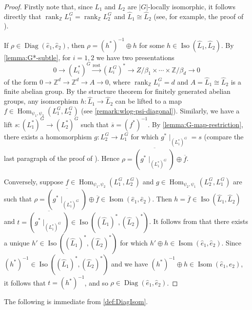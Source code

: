 \documentclass[11pt,a4paper,leqno]{amsart}
\theoremstyle{definition}
\theoremstyle{remark}
\newcommand{\wh}{\widehat}
\newcommand{\Z}{\mathbb{Z}}
\newcommand{\ol}{\overline}
\DeclareMathOperator{\Hom}{Hom}
\DeclareMathOperator{\rank}{rank}
\DeclareMathOperator{\Iso}{Iso}
\DeclareMathOperator{\Isom}{Isom}
\DeclareMathOperator{\DiagIsom}{Diag}
\DeclareMathOperator{\rest}{rest}
\renewcommand{\L}{L}
\newcommand{\bZ}{\mathbb Z}
\begin{document}
 
\begin{proof}
Firstly note that, since $L_1$ and $L_2$ are $|G|$-locally isomorphic, it follows directly that $\rank_{\bZ} L_1^G = \rank_{\bZ} L_2^G$ and $\wh L_1 \cong \wh L_2$ (see, for example, the proof of \cite[Proposition III.5]{Kreck:1984}).


If $\rho \in \DiagIsom(\wh e_1,\wh e_2)$, then  $\rho = (h^*)^{-1} \oplus h$ for some $h \in \Iso(\wh \L_1,\wh \L_2)$. 
By \cref{lemma:G*-subtle}, for $i = 1,2$ we have two presentations
\[ 0 \to (L_i^*)^G \xrightarrow[]{\rest} (L_i^G)^* \to  Z/\beta_1 \times \cdots \times \Z/\beta_d \to 0 \]
of the form $0 \to \bZ^d \to \bZ^d  \to A \to 0$, where $\rank_{\bZ} L_i^G = d$ and $A = \wh L_1 \cong \wh L_2$ is a finite abelian group.
 By the structure theorem for  finitely generated abelian groups, any isomorphism $h \colon \wh L_1 \to \wh L_2$ can be lifted to a map $f \in \Hom_{\psi_1,\psi_2}(\L_1^G,\L_2^G)$ (see \cref{remark:wlog-psi-diagonal}). 
Similarly, we have a lift 
$s\colon (\L_1^*)^G \to (\L_2^*)^G$ such that
  $\ol{s} = (f^*)^{-1}$. 
By \cref{lemma:G-map-restriction}, there exists a homomorphism $g\colon \L_2^G \to \L_1^G$ for which $g^*\mid_{(\L_1^*)^G} = s$ (compare the last paragraph of the proof of \cite[Proposition III.5]{Kreck:1984}).
Hence $\rho = \ol{(g^*\mid_{(\L_1^*)^G})} \oplus \ol{f}$.

Conversely, suppose $f \in \Hom_{\psi_1,\psi_2}(\L_1^G,\L_2^G)$ and $g \in \Hom_{\psi_2,\psi_1}(\L_2^G,\L_1^G)$ are such that $\rho = \ol{(g^*\mid_{(\L_1^*)^G})} \oplus \ol{f} \in \Isom(\wh e_1,\wh e_2)$. Then $h = \ol{f} \in \Iso(\wh L_1,\wh L_2)$ and $t = \ol{(g^*\mid_{(\L_1^*)^G})} \in \Iso((\wh L_1)^*,(\wh L_2)^*)$.
It follows from \cite[Proposition III.6]{Kreck:1984} that there exists a unique $h' \in \Iso((\wh L_1)^*,(\wh L_2)^*)$ for which $h' \oplus h \in \Isom(\wh e_1,\wh e_2)$. Since $(h^*)^{-1} \in \Iso((\wh L_1)^*,(\wh L_2)^*)$ and we have $(h^*)^{-1} \oplus h \in \Isom(\wh e_1,\wh e_2)$, it follows that $t = (h^*)^{-1}$, and so $\rho \in \DiagIsom(\wh e_1,\wh e_2)$.
\end{proof}




The following is immediate from \cref{def:DiagIsom}.
\end{document}
